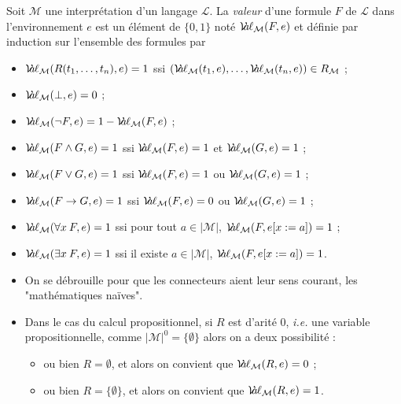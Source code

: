 \documentclass[./main]{subfiles}
\begin{document}
  \begin{defn}
    Soit $\mathcal{M}$ une interprétation d'un langage $\mathcal{L}$.
    La \textit{valeur} d'une formule $F$ de $\mathcal{L}$ dans l'environnement $e$ est un élément de $\{0,1\}$ noté $\mathcal{V}\hspace{-3.5pt}a\hspace{-0.5pt}\ell_{\mathcal{M}}(F, e)$ et définie par induction sur l'ensemble des formules par 

    {
      \footnotesize
    \begin{itemize}
      \item $\mathcal{V}\hspace{-3.5pt}a\hspace{-0.5pt}\ell_{\mathcal{M}}(R(t_1, \mathinner{\ldotp\ldotp\ldotp}, t_n), e) = 1$  ssi $(\mathcal{V}\hspace{-3.5pt}a\hspace{-0.5pt}\ell_{\mathcal{M}}(t_1, e), \mathinner{\ldotp\ldotp\ldotp}, \mathcal{V}\hspace{-3.5pt}a\hspace{-0.5pt}\ell_{\mathcal{M}}(t_n ,e)) \in R_{\mathcal{M}}$ ;
      \item $\mathcal{V}\hspace{-3.5pt}a\hspace{-0.5pt}\ell_{\mathcal{M}}(\bot, e) = 0$ ;
      \item $\mathcal{V}\hspace{-3.5pt}a\hspace{-0.5pt}\ell_{\mathcal{M}}(\lnot F, e) = 1 - \mathcal{V}\hspace{-3.5pt}a\hspace{-0.5pt}\ell_{\mathcal{M}}(F, e)$ ;
      \item $\mathcal{V}\hspace{-3.5pt}a\hspace{-0.5pt}\ell_{\mathcal{M}}(F \land G, e) = 1$ ssi $\mathcal{V}\hspace{-3.5pt}a\hspace{-0.5pt}\ell_{\mathcal{M}}(F, e) = 1$ et $\mathcal{V}\hspace{-3.5pt}a\hspace{-0.5pt}\ell_{\mathcal{M}}(G, e) = 1$ ;
      \item $\mathcal{V}\hspace{-3.5pt}a\hspace{-0.5pt}\ell_{\mathcal{M}}(F \lor G, e) = 1$ ssi $\mathcal{V}\hspace{-3.5pt}a\hspace{-0.5pt}\ell_{\mathcal{M}}(F, e) = 1$ ou $\mathcal{V}\hspace{-3.5pt}a\hspace{-0.5pt}\ell_{\mathcal{M}}(G, e) = 1$ ;
      \item $\mathcal{V}\hspace{-3.5pt}a\hspace{-0.5pt}\ell_{\mathcal{M}}(F \to G, e) = 1$ ssi $\mathcal{V}\hspace{-3.5pt}a\hspace{-0.5pt}\ell_{\mathcal{M}}(F, e) = 0$ ou $\mathcal{V}\hspace{-3.5pt}a\hspace{-0.5pt}\ell_{\mathcal{M}}(G, e) = 1$ ;
      \item $\mathcal{V}\hspace{-3.5pt}a\hspace{-0.5pt}\ell_{\mathcal{M}}(\forall x\:F, e) = 1$ ssi pour tout $a \in |\mathcal{M}|$, $\mathcal{V}\hspace{-3.5pt}a\hspace{-0.5pt}\ell_{\mathcal{M}}(F, e[x := a]) = 1$ ;
      \item $\mathcal{V}\hspace{-3.5pt}a\hspace{-0.5pt}\ell_{\mathcal{M}}(\exists x\:F, e) = 1$ ssi il existe $a \in |\mathcal{M}|$, $\mathcal{V}\hspace{-3.5pt}a\hspace{-0.5pt}\ell_{\mathcal{M}}(F, e[x := a]) = 1$.
    \end{itemize}
    }
  \end{defn}


  \begin{rmk}
    \begin{itemize}
      \item On se débrouille pour que les connecteurs aient leur sens courant, les "mathématiques naïves".
      \item Dans le cas du calcul propositionnel, si $R$ est d'arité $0$, \textit{i.e.} une variable propositionnelle, comme $|\mathcal{M}|^0 = \{\emptyset\}$ alors on a deux possibilité :
        \begin{itemize}
          \item ou bien $R = \emptyset$, et alors on convient que $\mathcal{V}\hspace{-3.5pt}a\hspace{-0.5pt}\ell_{\mathcal{M}}(R, e) = 0$ ;
          \item ou bien $R = \{\emptyset\} $, et alors on convient que $\mathcal{V}\hspace{-3.5pt}a\hspace{-0.5pt}\ell_{\mathcal{M}}(R, e) = 1$.
        \end{itemize}
    \end{itemize}
  \end{rmk}
\end{document}
